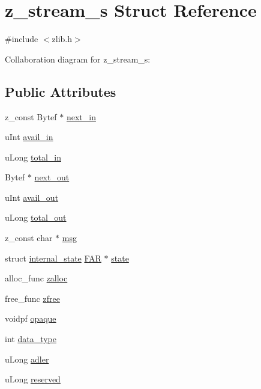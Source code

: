 \hypertarget{structz__stream__s}{}\section{z\+\_\+stream\+\_\+s Struct Reference}
\label{structz__stream__s}


{\ttfamily \#include $<$zlib.\+h$>$}



Collaboration diagram for z\+\_\+stream\+\_\+s\+:
\subsection*{Public Attributes}
\begin{DoxyCompactItemize}
\item 
z\+\_\+const Bytef $\ast$ \hyperlink{structz__stream__s_a71613678076af3a9a4bb28d51a146150}{next\+\_\+in}
\item 
u\+Int \hyperlink{structz__stream__s_a0cf177f50dbb49692f27480cbcfde794}{avail\+\_\+in}
\item 
u\+Long \hyperlink{structz__stream__s_aa8f408b9632737dc21519fa1ed34b08d}{total\+\_\+in}
\item 
Bytef $\ast$ \hyperlink{structz__stream__s_aed4a02cfe93e975314fed50b04427bf3}{next\+\_\+out}
\item 
u\+Int \hyperlink{structz__stream__s_a45ad2364307af9d944fd39d4eca3ca3c}{avail\+\_\+out}
\item 
u\+Long \hyperlink{structz__stream__s_abae26f1f236cf920250b9d37fdf009c1}{total\+\_\+out}
\item 
z\+\_\+const char $\ast$ \hyperlink{structz__stream__s_af116e1f45cb4399c0568b23b3e8b8c16}{msg}
\item 
struct \hyperlink{structinternal__state}{internal\+\_\+state} \hyperlink{jmorecfg_8h_aef060b3456fdcc093a7210a762d5f2ed}{F\+A\+R} $\ast$ \hyperlink{structz__stream__s_ac4a114217a1868dc6fbe7d1f5bda126b}{state}
\item 
alloc\+\_\+func \hyperlink{structz__stream__s_a23a2299c384f808e76e9908f21216b0f}{zalloc}
\item 
free\+\_\+func \hyperlink{structz__stream__s_a89eb750ade7f4f0b56bfdadf13344982}{zfree}
\item 
voidpf \hyperlink{structz__stream__s_ab72467f908d2ce65d5b42ee6556ef8bb}{opaque}
\item 
int \hyperlink{structz__stream__s_a9d8f63877d7639a8bca60f9fc3704fc4}{data\+\_\+type}
\item 
u\+Long \hyperlink{structz__stream__s_ade2217fe31e671be1257731883201223}{adler}
\item 
u\+Long \hyperlink{structz__stream__s_add73791dd19b49c9c68f3f3d328c37db}{reserved}
\end{DoxyCompactItemize}


